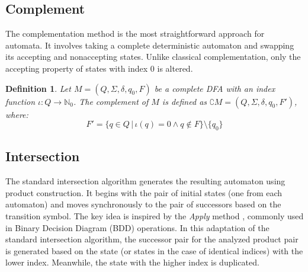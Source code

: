 \documentclass[pdflatex,sn-mathphys-num]{sn-jnl}%
\theoremstyle{thmstyleone}%
\theoremstyle{thmstyletwo}%
\theoremstyle{thmstylethree}%
\newtheorem{definition}{Definition}%
\begin{document}
    \subsection{Complement}
        The complementation method is the most straightforward approach for automata. It involves taking a complete deterministic automaton and swapping its accepting and nonaccepting states. Unlike classical complementation, only the accepting property of states with index $0$ is altered.

        \vspace*{0.5em}

        \begin{definition}
            Let $M = (Q, \Sigma, \delta, q_0, F)$ be a complete DFA with an index function $\iota : Q \rightarrow \mathbb{N}_0$. The complement of $M$ is defined as $\complement M = (Q, \Sigma, \delta, q_0, F')$, where:
            $$
            F' = \{q \in Q\,|\, \iota(q) = 0 \land q \notin F\}\setminus\{q_0\}
            $$
        \end{definition}

    \subsection{Intersection}
        The standard intersection algorithm generates the resulting automaton using product construction. It begins with the pair of initial states (one from each automaton) and moves synchronously to the pair of successors based on the transition symbol. The key idea is inspired by the \textit{Apply} method \cite{APPLY}, commonly used in Binary Decision Diagram (BDD) operations. In this adaptation of the standard intersection algorithm, the successor pair for the analyzed product pair is generated based on the state (or states in the case of identical indices) with the lower index. Meanwhile, the state with the higher index is duplicated.
\end{document}
